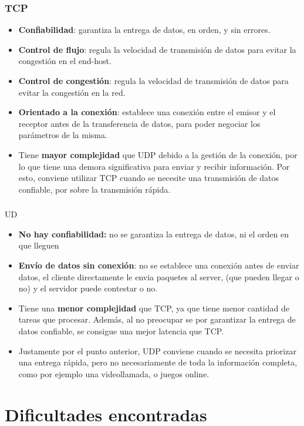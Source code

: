 \documentclass{article}
\begin{document}
\subsubsection{TCP}
\begin{itemize}
\item
  \textbf{Confiabilidad}: garantiza la entrega de datos, en orden, y sin errores.
\item
  \textbf{Control de flujo}: regula la velocidad de transmisión de datos para evitar la congestión en el end-host.
\item
  \textbf{Control de congestión}: regula la velocidad de transmisión de datos para evitar la congestión en la red.
\item
  \textbf{Orientado a la conexión}: establece una conexión entre el emisor y el receptor antes de la transferencia de datos, para poder negociar los parámetros de la misma.
\item
  Tiene \textbf{mayor complejidad} que UDP debido a la gestión de la conexión, por lo que tiene una demora significativa para enviar y recibir información. Por esto, conviene utilizar TCP cuando se necesite una transmisión de datos confiable, por sobre la transmisión rápida.
\end{itemize}

\subsubsection{
}UD
\begin{itemize}
\item
  \textbf{No hay confiabilidad:} no se garantiza la entrega de datos, ni el orden en que lleguen
\item
  \textbf{Envío de datos sin conexión}: no se establece una conexión antes de enviar datos, el cliente directamente le envia paquetes al server, (que pueden llegar o no) y el servidor puede contestar o no.
\item
  Tiene una \textbf{menor complejidad} que TCP, ya que tiene menor cantidad de tareas que procesar. Además, al no preocupar se por garantizar la entrega de datos confiable, se consigue una mejor latencia que TCP.
\item
  Justamente por el punto anterior, UDP conviene cuando se necesita priorizar una entrega rápida, pero no necesariamente de toda la información completa, como por ejemplo una videollamada, o juegos online.
\end{itemize}

\section{\texorpdfstring{\textbf{Dificultades
encontradas}}{Dificultades encontradas}}\label{dificultades-encontradas}
\end{document}
